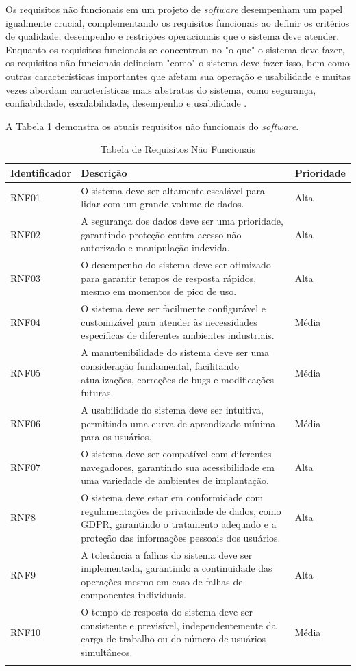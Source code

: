 Os requisitos não funcionais em um projeto de \textit{software} desempenham um papel igualmente crucial, complementando os requisitos funcionais ao definir os critérios de qualidade, desempenho e restrições operacionais que o sistema deve atender. Enquanto os requisitos funcionais se concentram no "o que" o sistema deve fazer, os requisitos não funcionais delineiam "como" o sistema deve fazer isso, bem como outras características importantes que afetam sua operação e usabilidade e muitas vezes abordam características mais abstratas do sistema, como segurança, confiabilidade, escalabilidade, desempenho e usabilidade \cite{softwareengreq}. 
            
A Tabela \ref{tab:ReqNaoFuncional} demonstra os atuais requisitos não funcionais do \textit{software}.

{\fontsize{10}{12}\selectfont \begin{longtable}
{| p{} | p{} | p{} |} 
    \hline
    \textbf{Identificador} & \textbf{Descrição} & \textbf{Prioridade} \\
    \hline
    RNF01 & O sistema deve ser altamente escalável para lidar com um grande volume de dados. & Alta \\
    \hline
    RNF02 & A segurança dos dados deve ser uma prioridade, garantindo proteção contra acesso não autorizado e manipulação indevida. & Alta \\
    \hline
    RNF03 & O desempenho do sistema deve ser otimizado para garantir tempos de resposta rápidos, mesmo em momentos de pico de uso. & Alta \\
    \hline
    RNF04 & O sistema deve ser facilmente configurável e customizável para atender às necessidades específicas de diferentes ambientes industriais. & Média \\
    \hline
    RNF05 & A manutenibilidade do sistema deve ser uma consideração fundamental, facilitando atualizações, correções de bugs e modificações futuras. & Média \\
    \hline
    RNF06 & A usabilidade do sistema deve ser intuitiva, permitindo uma curva de aprendizado mínima para os usuários. & Média \\
    \hline
    RNF07 & O sistema deve ser compatível com diferentes navegadores, garantindo sua acessibilidade em uma variedade de ambientes de implantação. & Alta \\
    \hline
    RNF8 & O sistema deve estar em conformidade com regulamentações de privacidade de dados, como GDPR, garantindo o tratamento adequado e a proteção das informações pessoais dos usuários. & Alta \\
    \hline
    RNF9 & A tolerância a falhas do sistema deve ser implementada, garantindo a continuidade das operações mesmo em caso de falhas de componentes individuais. & Alta \\
    \hline
    RNF10 & O tempo de resposta do sistema deve ser consistente e previsível, independentemente da carga de trabalho ou do número de usuários simultâneos. & Média \\
    \hline
\caption{Tabela de Requisitos Não Funcionais} %
\label{tab:ReqNaoFuncional}
\end{longtable}}

